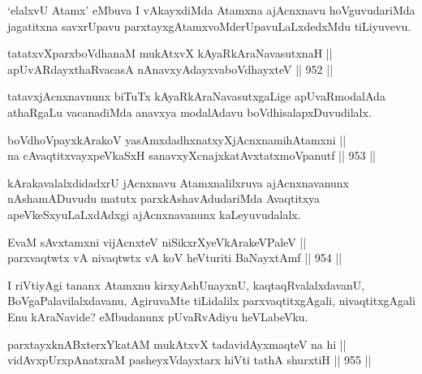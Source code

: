 \begin{artha}
`elalxvU Atamx' eMbuva I vAkayxdiMda Atamxna ajAcnxnavu hoVguvudariMda jagatitxna savxrUpavu parxtayxgAtamxvoMderUpavuLaLxdedxMdu tiLiyuvevu.
\end{artha}

\begin{shl}
tatatxvXparxboVdhanaM mukAtxvX kAyaRkAraNavasutxnaH || \\
apUvARdayxthaRvacasA nAnavxyAdayxvaboVdhayxteV \hfill || 952 ||  
\end{shl}

\begin{artha}
tatavxjAcnxnavnunx biTuTx kAyaRkAraNavasutxgaLige apUvaRmodalAda athaRgaLu vacanadiMda anavxya modalAdavu boVdhisalapxDuvudilalx.
\end{artha}


\begin{shl}
boVdhoV\s payxkArakoV yasAmxdadhxnatxyXjAcnxnamihA\s \s tamxni || \\
na cA\s \s vaqtitxvayxpeVkaSxH sanavxyXcnajxkatAvxtatxmoVpanutf \hfill || 953 ||  
\end{shl}

\begin{artha}
kArakavalalxdidadxrU jAcnxnavu Atamxnalilxruva ajAcnxnavanunx nAshamADuvudu matutx parxkAshavAdudariMda Avaqtitxya apeVkeSxyuLaLxdAdxgi ajAcnxnavanunx kaLeyuvudalalx.
\end{artha}


\begin{shl}
EvaM sAvxtamxni vijAcnxteV niSikxrXyeV\s kArakeV\s PaleV || \\
parxvaqtwtx vA nivaqtwtx vA koV heVturiti BaNayxtAmf \hfill || 954 ||  
\end{shl}

\begin{artha}
I riVtiyAgi tananx Atamxnu kirxyAshUnayxnU, kaqtaqRvalalxdavanU, BoVgaPalavilalxdavanu, AgiruvaMte tiLidalilx parxvaqtitxgAgali, nivaqtitxgAgali Enu kAraNavide? eMbudanunx pUvaRvAdiyu heVLabeVku.
\end{artha}

\begin{shl}
parxtayxknABxterxYkatAM mukAtxvX tadavidAyxmaqteV na hi || \\
vidAvxpUrxpAnatxraM pasheyxVdayxtarx hiVti tathA shurxtiH \hfill || 955 ||  
\end{shl}

